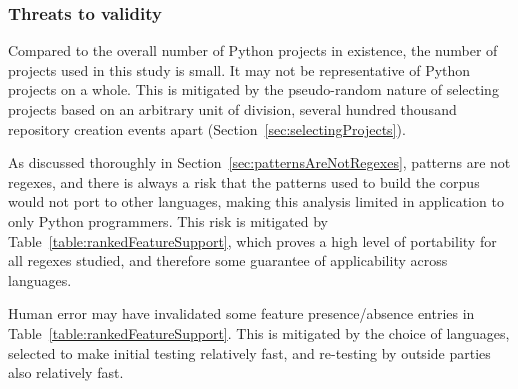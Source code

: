 \subsubsection{Threats to validity}
Compared to the overall number of Python projects in existence, the number of projects used in this study is small.  It may not be representative of Python projects on a whole.  This is mitigated by the pseudo-random nature of selecting projects based on an arbitrary unit of division, several hundred thousand repository creation events apart (Section~\ref{sec:selectingProjects}).

As discussed thoroughly in Section~\ref{sec:patternsAreNotRegexes}, patterns are not regexes, and there is always a risk that the patterns used to build the corpus would not port to other languages, making this analysis limited in application to only Python programmers.  This risk is mitigated by Table~\ref{table:rankedFeatureSupport}, which proves a high level of portability for all regexes studied, and therefore some guarantee of applicability across languages.

Human error may have invalidated some feature presence/absence entries in Table~\ref{table:rankedFeatureSupport}.  This is mitigated by the choice of languages, selected to make initial testing relatively fast, and re-testing by outside parties also relatively fast.


